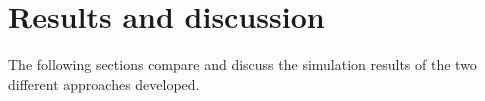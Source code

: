 \section{Results and discussion}
\label{results}
The following sections compare and discuss the simulation results of the two different approaches developed.
